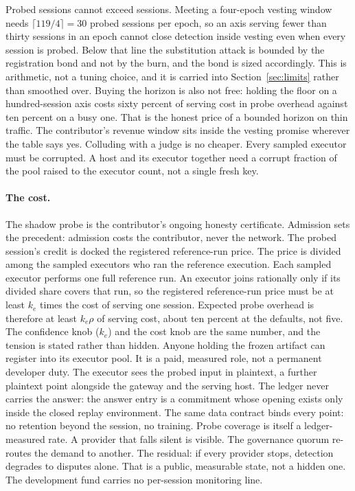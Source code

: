 \documentclass[11pt]{article}
\begin{document}
Probed sessions cannot exceed sessions. Meeting a four-epoch
vesting window needs $\lceil 119/4 \rceil = 30$ probed sessions
per epoch, so an axis serving fewer than thirty sessions in an
epoch cannot close detection inside vesting even when every
session is probed. Below that line the substitution attack is
bounded by the registration bond and not by the burn, and the
bond is sized accordingly. This is arithmetic, not a tuning
choice, and it is carried into Section~\ref{sec:limits} rather
than smoothed over. Buying the horizon is also not free: holding
the floor on a hundred-session axis costs sixty percent of
serving cost in probe overhead against ten percent on a busy one.
That is the honest price of a bounded horizon on thin traffic.
The
contributor's revenue window sits inside the vesting
promise wherever the table says yes. Colluding with a
judge is
no cheaper. Every sampled executor must be corrupted. A host and
its executor together need a corrupt fraction of the pool raised
to the executor count, not a single fresh key.
\paragraph{The cost.} The shadow probe is the contributor's
ongoing honesty certificate. Admission sets the precedent: admission costs
the contributor, never the network. The probed session's credit
is docked the registered reference-run price. The price is
divided among the sampled executors who ran the reference
execution. Each sampled executor performs one full reference run.
An executor joins rationally only if its divided share covers
that run, so the registered reference-run price must be at least
$k_e$ times the cost of serving one session. Expected probe
overhead is therefore at least $k_e\rho$ of serving cost, about
ten percent at the defaults, not five. The confidence knob
($k_e$) and the cost knob are the same number, and the tension is
stated rather than hidden. Anyone holding the frozen artifact can register into
its executor pool. It is a paid, measured role, not a permanent
developer duty. The executor sees the probed input in plaintext,
a further plaintext point alongside the gateway and the
serving host. The ledger never carries the answer: the answer
entry is a commitment whose opening exists only inside the
closed replay environment. The same
data contract binds every point: no retention
beyond the session, no training. Probe coverage is itself a
ledger-measured rate. A provider that falls silent is visible.
The governance quorum re-routes the demand to another. The
residual: if every provider stops, detection degrades to disputes
alone. That is a public, measurable state, not a hidden one. The
development fund carries no per-session monitoring line.
\end{document}
